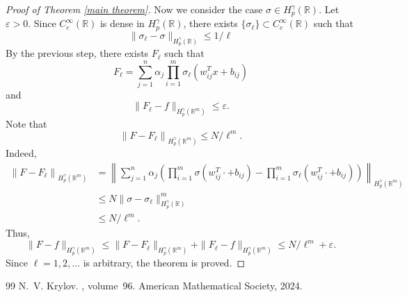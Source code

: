 \documentclass[10pt,a4paper]{amsart}
\newcommand\bR{\mathbb{R}}
\newcommand\ep{\varepsilon}
\begin{document}
\begin{proof}[Proof of Theorem \ref{main theorem}]
Now we consider the case $\sigma\in H_{p}^{\gamma}(\bR)$. Let $\ep>0$. Since $C_{c}^{\infty}(\bR)$ is dense in $H_{p}^{\gamma}(\bR)$, there exists $\{\sigma_{\ell}\}\subset C_{c}^{\infty}(\bR)$ such that 
\begin{equation}
\label{sigma approximation}
\|\sigma_{\ell} - \sigma\|_{H_{p}^{\gamma}(\bR)}\leq 1/\ell
\end{equation}
By the previous step, there exists $F_{\ell}$ such that
\begin{equation*}
F_{\ell} = \sum_{j = 1}^{n}\alpha_{j} \prod_{i = 1}^{m}\sigma_{\ell}\left( w^{T}_{ij} x + b_{ij} \right)
\end{equation*}
and 
\begin{equation*}
\| F_{\ell} - f \|_{H_{p}^{\gamma}(\bR^{m})} \leq \ep.
\end{equation*}
Note that
\begin{equation*}
\left\|F - F_{\ell} \right\|_{H_{p}^{\gamma}(\bR^{m})} \leq N/\ell^m.
\end{equation*}
Indeed,
\begin{equation*}
\begin{aligned}
\left\|F - F_{\ell} \right\|_{H_{p}^{\gamma}(\bR^{m})}
&=\left\| \sum_{j = 1}^{n}\alpha_{j} \left(\prod_{i = 1}^{m}\sigma\left( w^{T}_{ij} \cdot + b_{ij} \right) - \prod_{i = 1}^{m}\sigma_{\ell}\left( w^{T}_{ij} \cdot + b_{ij} \right) \right)\right\|_{H_{p}^{\gamma}(\bR^{m})} \\
&\leq N\| \sigma - \sigma_{\ell} \|_{H_{p}^{\gamma}(\bR)}^{m} \\
&\leq N/\ell^m.
\end{aligned}
\end{equation*}
Thus,
\begin{equation*}
\| F - f \|_{H_{p}^{\gamma}(\bR^{m})} 
\leq \|F - F_{\ell}\|_{H_{p}^{\gamma}(\bR^{m})}
+ \|F_{\ell} - f\|_{H_{p}^{\gamma}(\bR^{m})} \leq N/\ell^m+\ep.
\end{equation*}
Since $\ell=1,2,\dots$ is arbitrary, the theorem is proved.
\end{proof}

\begin{thebibliography}{99}
 N.~V. Krylov. , volume~96. \newblock American Mathematical Society, 2024.
\end{thebibliography}
\end{document}
